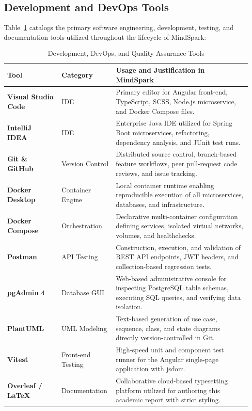 \subsection{Development and DevOps Tools}
\label{subsec:dev_tools}

Table~\ref{tab:dev_tools} catalogs the primary software engineering, development, testing, and documentation tools utilized throughout the lifecycle of MindSpark:

\begin{table}[H]
\centering
\caption{Development, DevOps, and Quality Assurance Tools}
\label{tab:dev_tools}
\small
\begin{tabularx}{\textwidth}{@{}l>{\raggedright}p{3.2cm}>{\raggedright\arraybackslash}X@{}}
\toprule
\textbf{Tool} & \textbf{Category} & \textbf{Usage and Justification in MindSpark} \\
\midrule
\textbf{Visual Studio Code}~\cite{vscode2026} & IDE & Primary editor for Angular front-end, TypeScript, SCSS, Node.js microservice, and Docker Compose files. \\
\textbf{IntelliJ IDEA}~\cite{intellij2026} & IDE & Enterprise Java IDE utilized for Spring Boot microservices, refactoring, dependency analysis, and JUnit test runs. \\
\textbf{Git \& GitHub}~\cite{git2026} & Version Control & Distributed source control, branch-based feature workflows, peer pull-request code reviews, and issue tracking. \\
\textbf{Docker Desktop}~\cite{docker2026} & Container Engine & Local container runtime enabling reproducible execution of all microservices, databases, and infrastructure. \\
\textbf{Docker Compose}~\cite{docker2026} & Orchestration & Declarative multi-container configuration defining services, isolated virtual networks, volumes, and healthchecks. \\
\textbf{Postman}~\cite{postman2026} & API Testing & Construction, execution, and validation of REST API endpoints, JWT headers, and collection-based regression tests. \\
\textbf{pgAdmin 4}~\cite{pgadmin2026} & Database GUI & Web-based administrative console for inspecting PostgreSQL table schemas, executing SQL queries, and verifying data isolation. \\
\textbf{PlantUML}~\cite{plantuml2026} & UML Modeling & Text-based generation of use case, sequence, class, and state diagrams directly version-controlled in Git. \\
\textbf{Vitest}~\cite{vitest2026} & Front-end Testing & High-speed unit and component test runner for the Angular single-page application with jsdom. \\
\textbf{Overleaf / LaTeX}~\cite{latex2026} & Documentation & Collaborative cloud-based typesetting platform utilized for authoring this academic report with strict styling. \\
\bottomrule
\end{tabularx}
\end{table}

